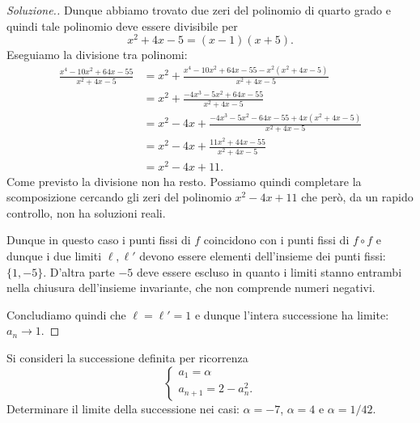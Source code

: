\documentclass[italian,a4paper]{scrartcl}
\begin{document}
\begin{proof}[Soluzione.]
Dunque abbiamo trovato due zeri del polinomio di quarto grado e quindi
tale polinomio deve essere divisibile per
\[
 x^2 + 4x - 5 = (x-1)(x+5).
\]
Eseguiamo la divisione tra polinomi:
\begin{align*}
\frac{x^4 - 10 x^2 + 64 x - 55}{x^2 + 4x - 5}
&= x^2 + \frac{x^4 - 10 x^2 + 64x - 55 - x^2 (x^2 + 4x - 5)}{x^2+4x-5}\\
&= x^2 + \frac{-4x^3 - 5 x^2 + 64 x - 55}{x^2+4x-5}\\
&= x^2 - 4x + \frac{-4x^3 - 5x^2 - 64 x - 55 + 4x(x^2+4x-5)}{x^2+4x-5}
\\
&= x^2 - 4x + \frac{11 x^2 + 44 x - 55}{x^2 + 4x -5}\\
&= x^2 - 4x + 11.
\end{align*}
Come previsto la divisione non ha resto. Possiamo quindi completare la
scomposizione cercando gli zeri del polinomio $x^2-4x+11$ che però, da
un rapido controllo, non ha soluzioni reali.

Dunque in questo caso i punti fissi di $f$ coincidono con i punti
fissi di $f\circ f$ e dunque i due limiti $\ell, \ell'$ devono essere
elementi dell'insieme dei punti fissi: $\{1, -5\}$. D'altra parte $-5$
deve essere escluso in quanto i limiti stanno entrambi nella chiusura
dell'insieme invariante, che non comprende numeri negativi.

Concludiamo quindi che $\ell = \ell' = 1$ e dunque l'intera
successione ha limite: $a_n \to 1$.
\end{proof}

\begin{exercise}\label{ex_7}
  Si consideri la successione definita per ricorrenza
  \[
  \begin{cases}
    a_1 = \alpha\\
    a_{n+1} = 2- a_n^2.
  \end{cases}
  \]
  Determinare il limite della successione nei casi: $\alpha=-7$, $\alpha=4$ e $\alpha=1/42$.
\end{exercise}
\end{document}
